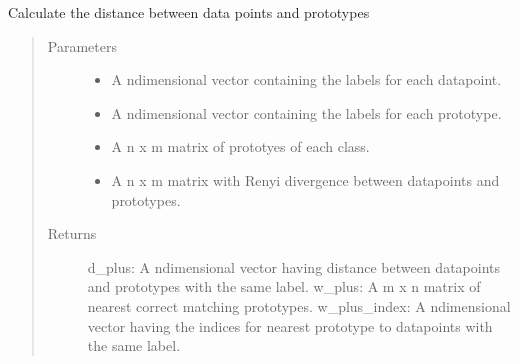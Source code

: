 \documentclass[letterpaper,10pt,english]{sphinxmanual}
\begin{document}
\begin{fulllineitems}
\begin{fulllineitems}
\end{fulllineitems}


\begin{fulllineitems}
\label{\detokenize{Renyi_final:Renyi_final.GLVQ.calculate_d_plus}}
\sphinxAtStartPar
Calculate the distance between data points and prototypes
\begin{quote}\begin{description}
\item[{Parameters}] \leavevmode\begin{itemize}
\item {} 
\sphinxAtStartPar
{} \textendash{} A n\sphinxhyphen{}dimensional vector containing the labels for each datapoint.

\item {} 
\sphinxAtStartPar
{} \textendash{} A n\sphinxhyphen{}dimensional vector containing the labels for each prototype.

\item {} 
\sphinxAtStartPar
{} \textendash{} A n x m matrix of prototyes of each class.

\item {} 
\sphinxAtStartPar
{} \textendash{} A n x m matrix with Renyi divergence between datapoints and prototypes.

\end{itemize}

\item[{Returns}] \leavevmode
\sphinxAtStartPar
d\_plus: A n\sphinxhyphen{}dimensional vector having distance between datapoints and prototypes with the same label.
w\_plus: A m x n matrix of nearest correct matching prototypes.
w\_plus\_index: A n\sphinxhyphen{}dimensional vector having the indices for nearest prototype to datapoints with the same label.

\end{description}\end{quote}

\end{fulllineitems}


\end{fulllineitems}
\end{document}
